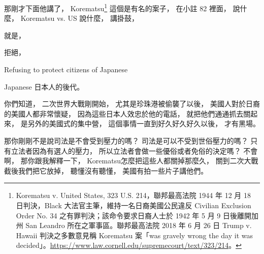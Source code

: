 \hypertarget{w06:cue:2373}{}那剛才下面他講了，
\hypertarget{w06:cue:2374}{}Korematsu\footnote{Korematsu v. United States, 323 U.S. 214，聯邦最高法院 1944 年 12 月 18 日判決，Black 大法官主筆，維持一名日裔美國公民違反 Civilian Exclusion Order No. 34 之有罪判決；該命令要求日裔人士於 1942 年 5 月 9 日後離開加州 San Leandro 所在之軍事區。聯邦最高法院 2018 年 6 月 26 日 Trump v. Hawaii 判決之多數意見稱 Korematsu 案「was gravely wrong the day it was decided」。\url{https://www.law.cornell.edu/supremecourt/text/323/214}。}
\hypertarget{w06:cue:2375}{}這個是有名的案子，
\hypertarget{w06:cue:2376}{}在小註 82 裡面，
\hypertarget{w06:cue:2377}{}說什麼，
\hypertarget{w06:cue:2378}{}Korematsu vs. US
\hypertarget{w06:cue:2379}{}說什麼，
\hypertarget{w06:cue:2380}{}講掛鼓，

\hypertarget{w06:cue:2381}{}就是，

\hypertarget{w06:cue:2382}{}拒絕，

\hypertarget{w06:cue:2383}{}Refusing to protect citizens of Japanese

\hypertarget{w06:cue:2384}{}Japanese
\hypertarget{w06:cue:2385}{}日本人的後代。

\hypertarget{w06:cue:2386}{}你們知道，
\hypertarget{w06:cue:2387}{}二次世界大戰剛開始，
\hypertarget{w06:cue:2388}{}尤其是珍珠港被偷襲了以後，
\hypertarget{w06:cue:2389}{}美國人對於日裔的美國人都非常懷疑，
\hypertarget{w06:cue:2390}{}因為這些日本人效忠於他的電話，
\hypertarget{w06:cue:2391}{}就把他們通通抓去關起來，
\hypertarget{w06:cue:2392}{}是另外的美國式的集中營，
\hypertarget{w06:cue:2393}{}這個事情一直到好久好久好久以後，
\hypertarget{w06:cue:2394}{}才有黑場。

\hypertarget{w06:cue:2395}{}那你剛剛不是說司法是不會受到壓力的嗎？
\hypertarget{w06:cue:2396}{}司法是可以不受到世俗壓力的嗎？
\hypertarget{w06:cue:2397}{}只有立法者因為有選人的壓力，
\hypertarget{w06:cue:2398}{}所以立法者會做一些優俗或者免俗的決定嗎？
\hypertarget{w06:cue:2399}{}不會啊，
\hypertarget{w06:cue:2400}{}那你跟我解釋一下，
\hypertarget{w06:cue:2401}{}Korematsu怎麼把這些人都關掉那麼久，
\hypertarget{w06:cue:2402}{}關到二次大戰截後我們把它放掉，
\hypertarget{w06:cue:2403}{}聽懂沒有聽懂，
\hypertarget{w06:cue:2404}{}美國有拍一些片子講他們。

